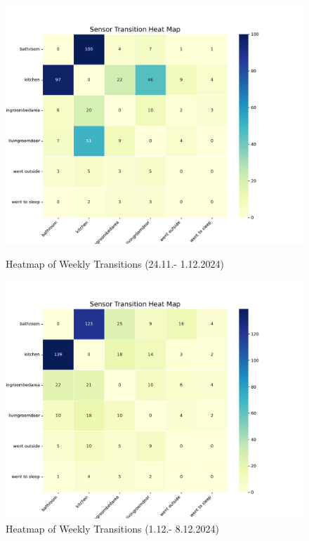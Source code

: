 \documentclass[A4,10pt]{article}
\begin{document}
\begin{figure}[H]
	\centering
	\begin{minipage}{0.45\textwidth}
		\centering
		\includegraphics[width=\textwidth]{heatmap1.pdf}
		\caption{Heatmap of Weekly Transitions (24.11.- 1.12.2024)}
		\label{fig:heatmap1}
	\end{minipage}\hspace{0.04\textwidth}
	\begin{minipage}{0.45\textwidth}
		\centering
		\includegraphics[width=\textwidth]{heatmap2.pdf}
		\caption{Heatmap of Weekly Transitions (1.12.- 8.12.2024)}
		\label{fig:heatmap2}
	\end{minipage}
\end{figure}
\end{document}

